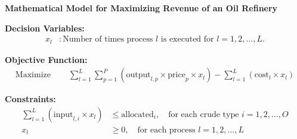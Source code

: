 \documentclass{article}
\begin{document}
\textbf{Mathematical Model for Maximizing Revenue of an Oil Refinery}

\textbf{Decision Variables:}
\begin{align*}
x_l & : \text{Number of times process } l \text{ is executed for } l = 1, 2, \ldots, L.
\end{align*}

\textbf{Objective Function:}
\begin{align*}
\text{Maximize } & \quad \sum_{l=1}^{L} \sum_{p=1}^{P} (\text{output}_{l,p} \times \text{price}_p \times x_l) - \sum_{l=1}^{L} (\text{cost}_l \times x_l)
\end{align*}

\textbf{Constraints:}
\begin{align*}
\sum_{l=1}^{L} (\text{input}_{l,i} \times x_l) & \leq \text{allocated}_i, \quad \text{for each crude type } i = 1, 2, \ldots, O \\
x_l & \geq 0, \quad \text{for each process } l = 1, 2, \ldots, L
\end{align*}
\end{document}
